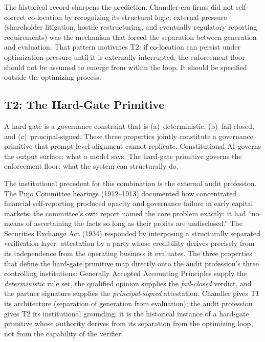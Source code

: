 \documentclass[11pt]{article}
\begin{document}
The historical record sharpens the prediction. Chandler-era firms did not self-correct co-location by recognizing its structural logic; external pressure (shareholder litigation, hostile restructuring, and eventually regulatory reporting requirements) was the mechanism that forced the separation between generation and evaluation. That pattern motivates T2: if co-location can persist under optimization pressure until it is externally interrupted, the enforcement floor should not be assumed to emerge from within the loop. It should be specified outside the optimizing process.

\subsection{T2: The Hard-Gate Primitive}

A hard gate is a governance constraint that is (a)~deterministic, (b)~fail-closed, and (c)~principal-signed. These three properties jointly constitute a governance primitive that prompt-level alignment cannot replicate. Constitutional AI \citep{bai2022} governs the output surface: what a model says. The hard-gate primitive governs the enforcement floor: what the system can structurally do.

The institutional precedent for this combination is the external audit profession. The Pujo Committee hearings (1912--1913) documented how concentrated financial self-reporting produced opacity and governance failure in early capital markets; the committee's own report named the core problem exactly: it had ``no means of ascertaining the facts so long as their profits are undisclosed.'' The Securities Exchange Act (1934) responded by interposing a structurally separated verification layer: attestation by a party whose credibility derives precisely from its independence from the operating business it evaluates. The three properties that define the hard-gate primitive map directly onto the audit profession's three controlling institutions: Generally Accepted Accounting Principles supply the \emph{deterministic} rule set, the qualified opinion supplies the \emph{fail-closed} verdict, and the partner signature supplies the \emph{principal-signed} attestation. Chandler gives T1 its architecture (separation of generation from evaluation); the audit profession gives T2 its institutional grounding; it is the historical instance of a hard-gate primitive whose authority derives from its separation from the optimizing loop, not from the capability of the verifier.
\end{document}

